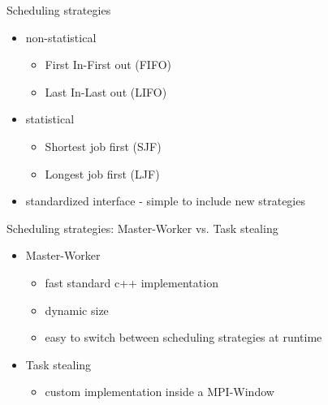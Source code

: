 	\begin{frame}{Scheduling strategies}
		\begin{itemize}
		\item<1-> non-statistical
		\begin{itemize}
			\item First In-First out (FIFO)
			\item Last In-Last out (LIFO)
		\end{itemize}
		\item<2-> statistical
		\begin{itemize}
			\item Shortest job first (SJF)
			\item Longest job first (LJF)
		\end{itemize}
		\item<3-> standardized interface - simple to include new strategies
		\end{itemize}
	\end{frame}
	\begin{frame}{Scheduling strategies: Master-Worker vs. Task stealing}
		\begin{itemize}
			\item<1-> Master-Worker
				\begin{itemize}
					\item fast standard c++ implementation
					\item dynamic size
					\item easy to switch between scheduling strategies at runtime	
				\end{itemize}
			
			\item<2-> Task stealing
					\begin{itemize}
						\item custom implementation inside a MPI-Window
					\end{itemize}
			
		\end{itemize}
	\end{frame}